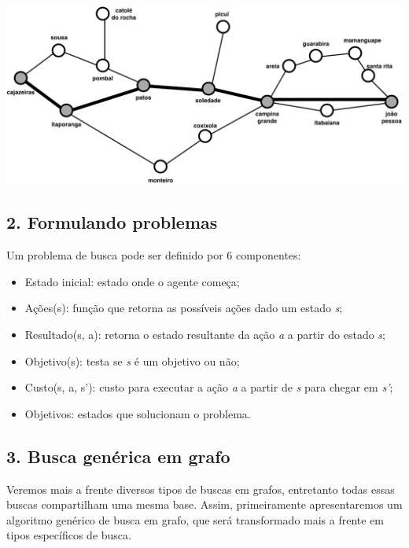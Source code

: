 \documentclass[brazil,]{article}
\providecommand{\tightlist}{%
  \setlength{\itemsep}{0pt}\setlength{\parskip}{0pt}}
\let\origfigure=\figure
\let\endorigfigure=\endfigure
\renewenvironment{figure}[1][]{%
\origfigure[H]
}{%
\endorigfigure
}
\begin{document}
\begin{figure}
\centering
\includegraphics{pbmapa-solucao.png}
\caption{Caminho entre a cidade João Pessoa e Cajazeiras.}
\end{figure}

\subsection{2. Formulando problemas}\label{formulando-problemas}

Um problema de busca pode ser definido por 6 componentes:

\begin{itemize}
\tightlist
\item
  Estado inicial: estado onde o agente começa;
\item
  Ações(s): função que retorna as possíveis ações dado um estado
  \emph{s};
\item
  Resultado(s, a): retorna o estado resultante da ação \emph{a} a partir
  do estado \emph{s};
\item
  Objetivo(s): testa se \emph{s} é um objetivo ou não;
\item
  Custo(s, a, s'): custo para executar a ação \emph{a} a partir de
  \emph{s} para chegar em \emph{s'};
\item
  Objetivos: estados que solucionam o problema.
\end{itemize}

\subsection{3. Busca genérica em
grafo}\label{busca-genuxe9rica-em-grafo}

Veremos mais a frente diversos tipos de buscas em grafos, entretanto
todas essas buscas compartilham uma mesma base. Assim, primeiramente
apresentaremos um algoritmo genérico de busca em grafo, que será
transformado mais a frente em tipos específicos de busca.
\end{document}
